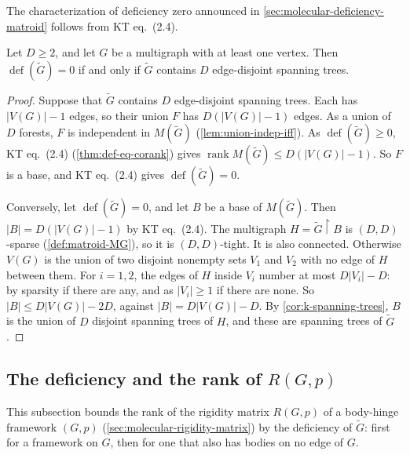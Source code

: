 The characterization of deficiency zero announced in
\cref{sec:molecular-deficiency-matroid} follows from KT eq.~(2.4).

\begin{lemma}
  \label{lem:deficiency-zero-iff-tree-packing}
  \leanok
  Let $D \ge 2$, and let $G$ be a multigraph with at least one vertex.
  Then $\operatorname{def}(\tilde G) = 0$ if and only if $\tilde G$
  contains $D$ edge-disjoint spanning trees.
\end{lemma}
\begin{proof}
  \leanok
  Suppose that $\tilde G$ contains $D$ edge-disjoint spanning trees.
  Each has $|V(G)| - 1$ edges, so their union $F$ has $D(|V(G)| - 1)$
  edges. As a union of $D$ forests, $F$ is independent in $M(\tilde G)$
  (\cref{lem:union-indep-iff}). As $\operatorname{def}(\tilde G) \ge 0$,
  KT eq.~(2.4) (\cref{thm:def-eq-corank}) gives
  $\operatorname{rank} M(\tilde G) \le D(|V(G)| - 1)$. So $F$ is a base,
  and KT eq.~(2.4) gives $\operatorname{def}(\tilde G) = 0$.

  Conversely, let $\operatorname{def}(\tilde G) = 0$, and let $B$ be a
  base of $M(\tilde G)$. Then $|B| = D(|V(G)| - 1)$ by KT eq.~(2.4). The
  multigraph $H = \tilde G \restriction B$ is $(D, D)$-sparse
  (\cref{def:matroid-MG}), so it is $(D, D)$-tight. It is also
  connected. Otherwise $V(G)$ is the union of two disjoint nonempty sets
  $V_1$ and $V_2$ with no edge of $H$ between them. For $i = 1, 2$, the
  edges of $H$ inside $V_i$ number at most $D|V_i| - D$: by sparsity if
  there are any, and as $|V_i| \ge 1$ if there are none. So
  $|B| \le D|V(G)| - 2D$, against $|B| = D|V(G)| - D$. By
  \cref{cor:k-spanning-trees}, $B$ is the union of $D$ disjoint spanning
  trees of $H$, and these are spanning trees of $\tilde G$.
\end{proof}

\subsection{The deficiency and the rank of \texorpdfstring{$R(G,p)$}{R(G,p)}}
\label{sec:molecular-deficiency-rank-bound}

This subsection bounds the rank of the rigidity matrix $R(G,p)$ of a
body-hinge framework $(G,p)$ (\cref{sec:molecular-rigidity-matrix}) by
the deficiency of $\tilde G$: first for a framework on $G$, then for one
that also has bodies on no edge of $G$.

